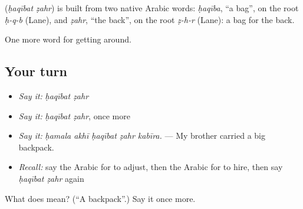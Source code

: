 \begin{cousinweb}
\textbf{ } (\emph{ḥaqībat ẓahr}) is built from two native Arabic words: \emph{ḥaqība}, \textquotedblleft{}a bag\textquotedblright{}, on the root \emph{ḥ-q-b} (Lane), and \emph{ẓahr}, \textquotedblleft{}the back\textquotedblright{}, on the root \emph{ẓ-h-r} (Lane): a bag for the back.
\end{cousinweb}

\begin{grammarlens}[title={What you've built}]
One more word for getting around.
\end{grammarlens}

\subsection*{Your turn}
\begin{itemize}
\raggedright
  \item \emph{Say it:} \emph{ḥaqībat ẓahr}
  \item \emph{Say it:} \emph{ḥaqībat ẓahr}, once more
  \item \emph{Say it:} \emph{ḥamala akhī ḥaqībat ẓahr kabīra.} — My brother carried a big backpack.
  \item \emph{Recall:} say the Arabic for to adjust, then the Arabic for to hire, then say \emph{ḥaqībat ẓahr} again
\end{itemize}

\begin{tcolorbox}[breakable,colback=teal!4,colframe=teal!35!black,title={Before you move on}]
What does   mean? (\textquotedblleft{}A backpack\textquotedblright{}.) Say it once more.
\end{tcolorbox}
